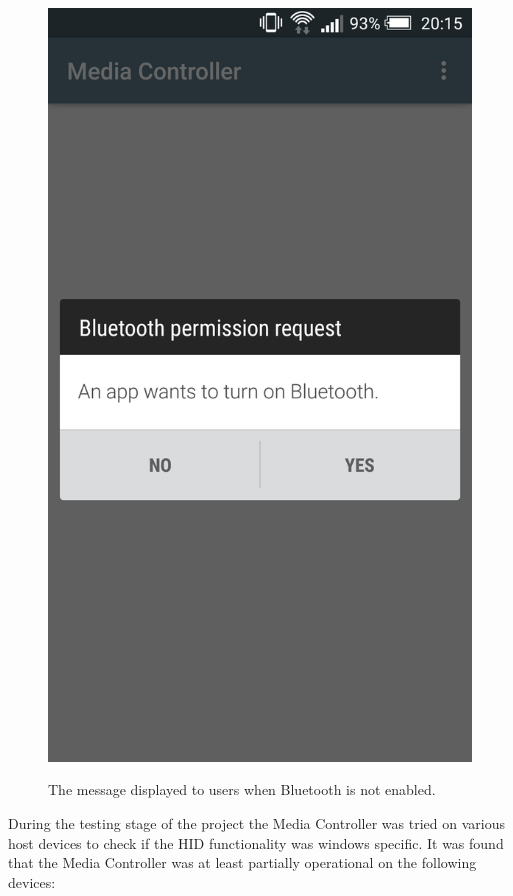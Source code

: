 \documentclass{article}
\begin{document}
		\begin{figure}[h]
			\centering
			{\includegraphics[scale = 0.1]{app02}}
			\caption{The message displayed to users when Bluetooth is not enabled.}
			\label{app02}
		\end{figure}
			
		\noindent
		During the testing stage of the project the Media Controller was tried on various host devices to check if the HID functionality was windows specific. It was found that the Media Controller was at least partially operational on the following devices:
		
\end{document}
